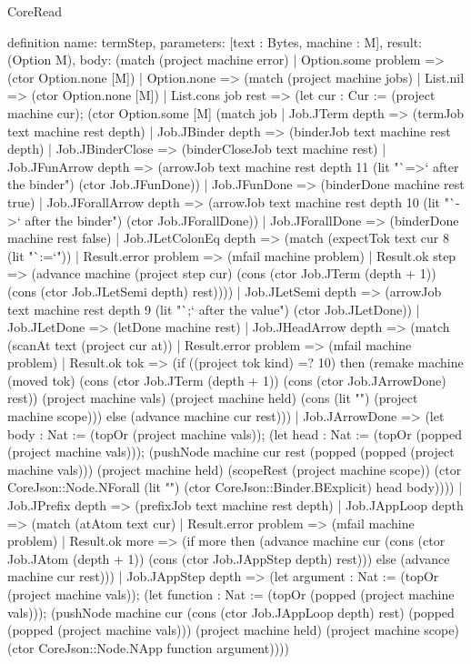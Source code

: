 \begin{lexlean}{CoreRead}
\begin{semanticmodule}
definition{
  name: termStep,
  parameters: [text : Bytes, machine : M],
  result: (Option M),
  body: (match (project machine error)
    | Option.some problem => (ctor Option.none [M])
    | Option.none => (match (project machine jobs)
      | List.nil => (ctor Option.none [M])
      | List.cons job rest => (let cur : Cur := (project machine cur); (ctor Option.some [M] (match job
        | Job.JTerm depth => (termJob text machine rest depth)
        | Job.JBinder depth => (binderJob text machine rest depth)
        | Job.JBinderClose => (binderCloseJob text machine rest)
        | Job.JFunArrow depth => (arrowJob text machine rest depth 11 (lit "`=>` after the binder") (ctor Job.JFunDone))
        | Job.JFunDone => (binderDone machine rest true)
        | Job.JForallArrow depth => (arrowJob text machine rest depth 10 (lit "`->` after the binder") (ctor Job.JForallDone))
        | Job.JForallDone => (binderDone machine rest false)
        | Job.JLetColonEq depth => (match (expectTok text cur 8 (lit "`:=`"))
          | Result.error problem => (mfail machine problem)
          | Result.ok step => (advance machine (project step cur) (cons (ctor Job.JTerm (depth + 1)) (cons (ctor Job.JLetSemi depth) rest))))
        | Job.JLetSemi depth => (arrowJob text machine rest depth 9 (lit "`;` after the value") (ctor Job.JLetDone))
        | Job.JLetDone => (letDone machine rest)
        | Job.JHeadArrow depth => (match (scanAt text (project cur at))
          | Result.error problem => (mfail machine problem)
          | Result.ok tok => (if ((project tok kind) =? 10) then (remake machine (moved tok) (cons (ctor Job.JTerm (depth + 1)) (cons (ctor Job.JArrowDone) rest)) (project machine vals) (project machine held) (cons (lit "") (project machine scope))) else (advance machine cur rest)))
        | Job.JArrowDone => (let body : Nat := (topOr (project machine vals)); (let head : Nat := (topOr (popped (project machine vals))); (pushNode machine cur rest (popped (popped (project machine vals))) (project machine held) (scopeRest (project machine scope)) (ctor CoreJson::Node.NForall (lit "") (ctor CoreJson::Binder.BExplicit) head body))))
        | Job.JPrefix depth => (prefixJob text machine rest depth)
        | Job.JAppLoop depth => (match (atAtom text cur)
          | Result.error problem => (mfail machine problem)
          | Result.ok more => (if more then (advance machine cur (cons (ctor Job.JAtom (depth + 1)) (cons (ctor Job.JAppStep depth) rest))) else (advance machine cur rest)))
        | Job.JAppStep depth => (let argument : Nat := (topOr (project machine vals)); (let function : Nat := (topOr (popped (project machine vals))); (pushNode machine cur (cons (ctor Job.JAppLoop depth) rest) (popped (popped (project machine vals))) (project machine held) (project machine scope) (ctor CoreJson::Node.NApp function argument))))
}
\end{semanticmodule}
\end{lexlean}
